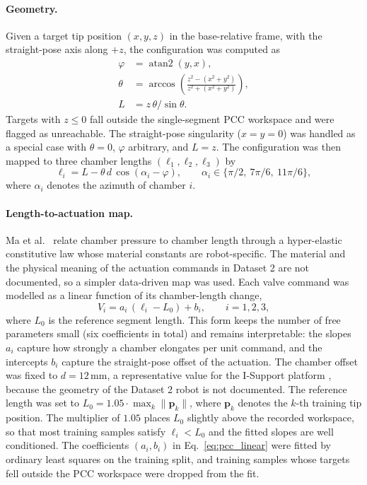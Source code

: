 \paragraph{Geometry.}
Given a target tip position $(x, y, z)$ in the base-relative frame, with the straight-pose axis along $+z$, the configuration was computed as
\begin{align}
  \varphi &= \operatorname{atan2}(y, x), \label{eq:pcc_phi} \\
  \theta  &= \arccos\!\left(\frac{z^{2} - (x^{2} + y^{2})}{z^{2} + (x^{2} + y^{2})}\right), \label{eq:pcc_theta} \\
  L       &= z \, \theta / \sin\theta. \label{eq:pcc_L}
\end{align}
Targets with $z \le 0$ fall outside the single-segment PCC workspace and were flagged as unreachable. The straight-pose singularity ($x = y = 0$) was handled as a special case with $\theta = 0$, $\varphi$ arbitrary, and $L = z$. The configuration was then mapped to three chamber lengths $(\ell_1, \ell_2, \ell_3)$ by
\begin{equation}
  \ell_i = L - \theta \, d \, \cos(\alpha_i - \varphi), \qquad \alpha_i \in \{\pi/2,\ 7\pi/6,\ 11\pi/6\}, \label{eq:pcc_lengths}
\end{equation}
where $\alpha_i$ denotes the azimuth of chamber $i$.

\paragraph{Length-to-actuation map.}
Ma et al.\ \cite{ma2022bp} relate chamber pressure to chamber length through a hyper-elastic constitutive law whose material constants are robot-specific. The material and the physical meaning of the actuation commands in Dataset 2 are not documented, so a simpler data-driven map was used. Each valve command was modelled as a linear function of its chamber-length change,
\begin{equation}
  V_i = a_i \, (\ell_i - L_0) + b_i, \qquad i = 1, 2, 3, \label{eq:pcc_linear}
\end{equation}
where $L_0$ is the reference segment length. This form keeps the number of free parameters small (six coefficients in total) and remains interpretable: the slopes $a_i$ capture how strongly a chamber elongates per unit command, and the intercepts $b_i$ capture the straight-pose offset of the actuation. The chamber offset was fixed to $d = 12$\,mm, a representative value for the I-Support platform \cite{manti2016soft}, because the geometry of the Dataset 2 robot is not documented. The reference length was set to $L_0 = 1.05 \cdot \max_k \| \mathbf{p}_k \|$, where $\mathbf{p}_k$ denotes the $k$-th training tip position. The multiplier of $1.05$ places $L_0$ slightly above the recorded workspace, so that most training samples satisfy $\ell_i < L_0$ and the fitted slopes are well conditioned. The coefficients $(a_i, b_i)$ in Eq.~\eqref{eq:pcc_linear} were fitted by ordinary least squares on the training split, and training samples whose targets fell outside the PCC workspace were dropped from the fit.

